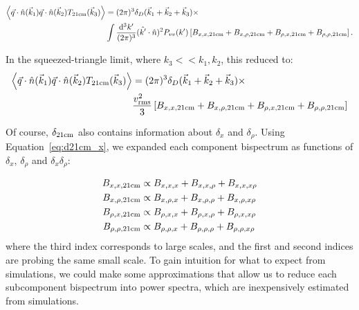 \begin{equation}
\begin{split}
\left\langle \vec{q} \cdot \hat{n}(\vec{k}_1) \vec{q} \cdot \hat{n} (\vec{k}_2) T_{\rm 21cm}(\vec{k}_3) \right\rangle &= 
(2\pi)^3 \delta_D(\vec{k}_1 + \vec{k}_2 + \vec{k}_3) \times \\
& \int \frac{{\rm d^3}k'}{(2\pi)^3} (\hat{k'}\cdot\hat{n})^2 P_{vv}(k') 
\left[ B_{x,x,\rm 21cm} + B_{x,\rho,\rm 21cm} + B_{\rho,x,\rm 21cm} +B_{\rho,\rho,\rm 21cm} \right].
\end{split}
\end{equation}

In the squeezed-triangle limit, where $k_3 << k_1,k_2$, this reduced to:
\begin{equation}
\begin{split}
\left\langle \vec{q} \cdot \hat{n}(\vec{k}_1) \vec{q} \cdot \hat{n} (\vec{k}_2) T_{{\rm 21cm}}(\vec{k}_3) \right\rangle &= 
(2\pi)^3 \delta_D(\vec{k}_1 + \vec{k}_2 + \vec{k}_3) \times \\
& \frac{v_{\rm rms}^2}{3} 
\left[ B_{x,x,{\rm 21cm}} + B_{x,\rho,{\rm 21cm}} + B_{\rho,x,{\rm 21cm}} +B_{\rho,\rho,{\rm 21cm}} \right]
\end{split}
\label{eq:component_bispectra}
\end{equation}

Of course, $\delta_{\rm 21cm}$ also contains information about $\delta_x$ and $\delta_{\rho}$. Using Equation~\ref{eq:d21cm_x}, we expanded each component bispectrum as functions of $\delta_x$, $\delta_{\rho}$ and $\delta_x\delta_{\rho}$:

\begin{equation}
\begin{split}
B_{x,x,{\rm 21cm}} &\propto B_{x,x,x} + B_{x,x,\rho} + B_{x,x,x\rho}\\
B_{x,\rho,{\rm 21cm}} &\propto B_{x,\rho,x} + B_{x,\rho,\rho} + B_{x,\rho,x\rho}\\
B_{\rho,x,{\rm 21cm}} &\propto B_{\rho,x,x} + B_{\rho,x,\rho} + B_{\rho,x,x\rho}\\
B_{\rho,\rho,{\rm 21cm}} &\propto B_{\rho,\rho,x} + B_{\rho,\rho,\rho} + B_{\rho,\rho,x\rho}\\
\end{split}
\label{eq:lots_of_bispectra}
\end{equation}
where the third index corresponds to large scales, and the first and second indices are probing the same small scale. To gain intuition for what to expect from simulations, we could make some approximations that allow us to reduce each subcomponent bispectrum into power spectra, which are inexpensively estimated from simulations.

